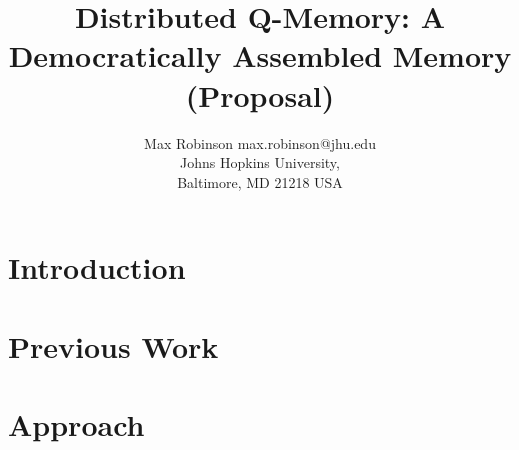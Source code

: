 \documentclass[jair,twoside,11pt,theapa]{article}
\begin{document}
\title{Distributed Q-Memory: A Democratically Assembled Memory (Proposal)}

\author{\name Max Robinson \email max.robinson@jhu.edu \\
       \addr Johns Hopkins University,\\
       Baltimore, MD 21218 USA
   }


\maketitle


\begin{abstract}

\end{abstract}

\section{Introduction}
\label{Introduction}


\section{Previous Work}
\label{Literature Survey}

\section{Approach}
\label{hypothesis}




\vskip 0.2in
%

\end{document}
